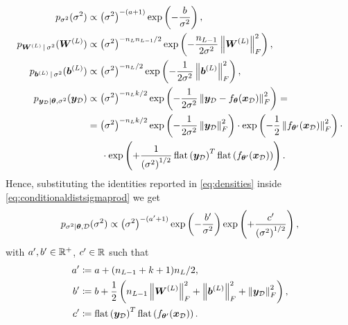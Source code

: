 \begin{equation} \label{eq:densities}
	\begin{aligned}
		p_{\sigma^2}(\sigma^2) & \propto \left(\sigma^2\right)^{-(a + 1)} \operatorname{exp}\left(-\frac{b}{\sigma^2}\right), \\
		p_{\bm{W}^{(L)} \, | \, \sigma^2}(\bm{W}^{(L)}) & \propto \left(\sigma^2\right)^{-n_{L} n_{L - 1} / 2} \operatorname{exp}\left(-\frac{n_{L - 1}}{2 \sigma^2} \left\lVert\bm{W}^{(L)}\right\rVert^2_F\right), \\
		p_{\bm{b}^{(L)} \, | \, \sigma^2}(\bm{b}^{(L)}) & \propto \left(\sigma^2\right)^{-n_{L}/2} \operatorname{exp}\left(-\frac{1}{2 \sigma^2} \left\lVert\bm{b}^{(L)}\right\rVert^2_F\right), \\
		p_{\bm{y}_{\mathcal{D}} | \bm{\theta}, \sigma^2}(\bm{y}_{\mathcal{D}}) & \propto \left(\sigma^2\right)^{-n_L k/ 2} \operatorname{exp}\left(-\frac{1}{2\sigma^2} \left\lVert\bm{y}_{\mathcal{D}} - f_{\bm{\theta}}(\bm{x}_{\mathcal{D}})\right\rVert_F^2\right) = \\
		& = \left(\sigma^2\right)^{-n_L k / 2} \operatorname{exp}\left(-\frac{1}{2 \sigma^2} \left\lVert\bm{y}_{\mathcal{D}}\right\rVert_F^2\right) \cdot \operatorname{exp}\left(-\frac{1}{2} \left\lVert f_{\bm{\theta}'}(\bm{x}_{\mathcal{D}})\right\rVert_F^2\right) \cdot \\
		& \kern14.65pt \cdot \operatorname{exp}\left(+\frac{1}{\left(\sigma^2\right)^{1/2}} \operatorname{flat}\left(\bm{y}_{\mathcal{D}}\right)^T \operatorname{flat}\left(f_{\bm{\theta}'}(\bm{x}_{\mathcal{D}})\right)\right).
	\end{aligned}
\end{equation}
Hence, substituting the identities reported in \cref{eq:densities} inside \cref{eq:conditionaldistsigmaprod} we get
\begin{equation} \label{eq:conditionaldistsigma}
	\begin{aligned}
		p_{\sigma^2 | \bm{\theta}, \mathcal{D}}(\sigma^2) \propto \left(\sigma^2\right)^{-(a' + 1)} \operatorname{exp}\left(-\frac{b'}{\sigma^2}\right) \operatorname{exp}\left(+\frac{c'}{\left(\sigma^2\right)^{1/2}}\right),
	\end{aligned}
\end{equation}
with $a', b' \in \mathbb{R}^+$, $c' \in \mathbb{R}$ such that
\begin{equation*}
	\begin{aligned}
		a' & \coloneqq a + (n_{L - 1} + k + 1) n_L / 2, \\
		b' & \coloneqq b + \frac{1}{2} \left(n_{L - 1} \left\lVert\bm{W}^{(L)}\right\rVert^2_F + \left\lVert\bm{b}^{(L)}\right\rVert^2_F + \left\lVert\bm{y}_{\mathcal{D}}\right\rVert_F^2\right), \\
		c' & \coloneqq \operatorname{flat}\left(\bm{y}_{\mathcal{D}}\right)^T \operatorname{flat}\left(f_{\bm{\theta}'}(\bm{x}_{\mathcal{D}})\right).
	\end{aligned}
\end{equation*}
